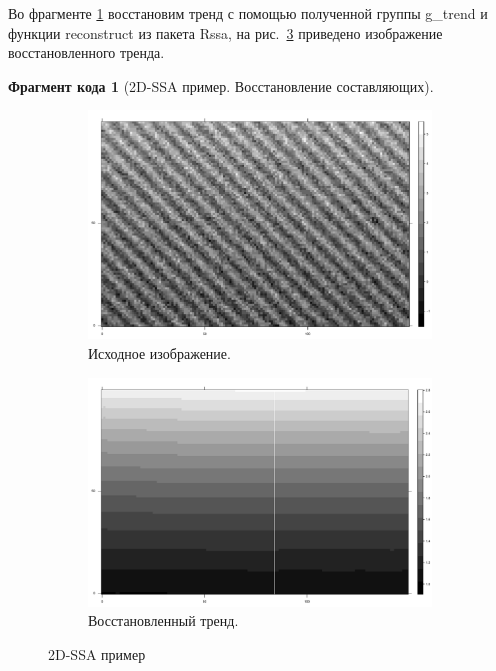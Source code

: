 \documentclass[specialist,
               substylefile = spbu.rtx,
               subf,href,colorlinks=true, 12pt]{disser}
\newtheorem{fragment}{Фрагмент кода}[section]
\begin{document}
Во фрагменте \ref{frag:2dssa_rec} восстановим тренд с помощью полученной группы g\_trend и  функции reconstruct из пакета Rssa, на рис.~\ref{fig:2dssa_rec} приведено изображение восстановленного тренда.
\begin{fragment}[2D-SSA пример. Восстановление составляющих]
\label{frag:2dssa_rec}

\end{fragment}
\begin{figure}[hhh!]
        \centering
    \begin{subfigure}[b]{0.45\textwidth}
        \includegraphics[width=\textwidth]{2dssa_series}
        \caption{Исходное изображение.}
        \label{fig:2dssa_series}
    \end{subfigure}
        \quad
    \begin{subfigure}[b]{0.45\textwidth}
       \includegraphics[width=\textwidth]{2dssa_rec}
        \caption{Восстановленный тренд.}
        \label{fig:2dssa_rec}
    \end{subfigure}
    \caption{2D-SSA пример}
\end{figure}
\end{document}
